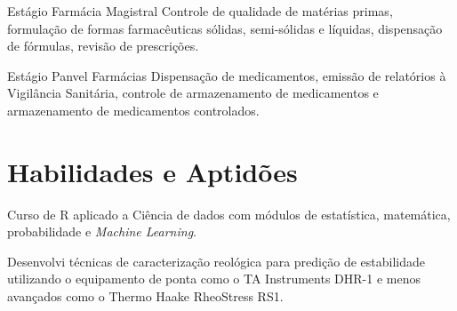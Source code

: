 {Estágio}
{Farmácia Magistral}
{Controle de qualidade de matérias primas, 
formulação de formas farmacêuticas sólidas, 
semi-sólidas e líquidas, dispensação de fórmulas, 
revisão de prescrições.}

{Estágio}
{Panvel Farmácias}
{Dispensação de medicamentos, 
emissão de relatórios à Vigilância Sanitária, 
controle de armazenamento de medicamentos e 
armazenamento de medicamentos controlados.}

\section{Habilidades e Aptidões}


	{
	Curso de R aplicado a Ciência de dados com módulos de
	estatística, matemática, probabilidade e \emph{Machine Learning}.
	}
	
	{
	Desenvolvi técnicas de caracterização reológica para 
	predição de estabilidade utilizando o 
	equipamento de ponta como o TA Instruments DHR-1 e 
	menos avançados como o Thermo Haake RheoStress RS1.
	}

\renewcommand{\labelitemi}{\textendash}



